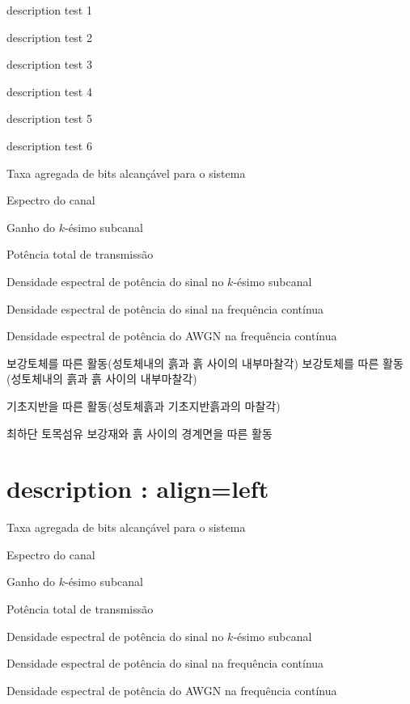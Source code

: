 			\begin{description}[style=sameline, leftmargin=2cm]
			\setlength\topsep{0.0em}
			\setlength\itemsep{-0.5em}

			\item	[description 1]	description test 1
			\item	[description]		description test 2
			\item	[descrip]			description test 3
			\item	[descrip]			description test 4
			\item	[desc]			description test 5
			\item	[d]				description test 6
			\item[$b$] Taxa agregada de bits alcançável para o sistema
			\item[$H(f)$] Espectro do canal
			\item[$H_k$] Ganho do $k$-ésimo subcanal
			\item[$P_x$] Potência total de transmissão
			\item[$s_k$] Densidade espectral de potência do sinal no $k$-ésimo subcanal
			\item[$Sx(f)$] Densidade espectral de potência do sinal na frequência contínua
			\item[$Sn(f)$] Densidade espectral de potência do AWGN na frequência contínua
			\item[1]	보강토체를 따른 활동(성토체내의 흙과 흙 사이의 내부마찰각) 
					보강토체를 따른 활동(성토체내의 흙과 흙 사이의 내부마찰각) 
			\item[2]	기초지반을 따른 활동(성토체흙과 기초지반흙과의 마찰각) 
			\item[3]	최하단 토목섬유 보강재와 흙 사이의 경계면을 따른 활동 

			\end{description}

		
	\section{description : align=left}
		\begin{description}[labelsep=3em, align=left]
		\setlength\topsep{0.0em}
		\setlength\itemsep{-1.0em}

		\item[$b$] Taxa agregada de bits alcançável para o sistema
		\item[$H(f)$] Espectro do canal
		\item[$H_k$] Ganho do $k$-ésimo subcanal
		\item[$P_x$] Potência total de transmissão
		\item[$s_k$] Densidade espectral de potência do sinal no $k$-ésimo subcanal
		\item[$Sx(f)$] Densidade espectral de potência do sinal na frequência contínua
		\item[$Sn(f)$] Densidade espectral de potência do AWGN na frequência contínua
		\end{description}




